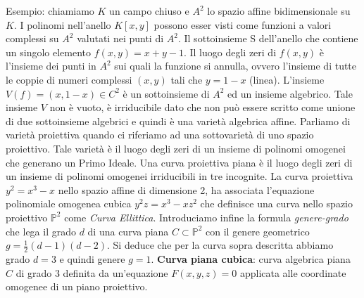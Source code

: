 \documentclass[a4paper,12pt]{tesiinfo}
\newcommand\ddfrac[2]{\frac{\displaystyle #1}{\displaystyle #2}}
\begin{document}
\newline
Esempio: chiamiamo $K$ un campo chiuso e $A^2$ lo spazio affine bidimensionale su $K$. I polinomi nell'anello $K[x, y]$ possono esser visti come funzioni a valori complessi su $A^2$ valutati nei punti di $A^2$. Il sottoinsieme S dell'anello che contiene un singolo elemento $f(x, y) = x + y - 1$. Il luogo degli zeri di $f(x, y)$ \`e l'insieme dei punti in $A^2$ sui quali la funzione si annulla, ovvero l'insieme di tutte le coppie di numeri complessi $(x, y)$ tali che $y = 1 - x$ (linea). L'insieme $V(f) = {(x, 1-x) \in C^2}$ \`e un sottoinsieme di $A^2$ ed un insieme algebrico. Tale insieme $V$ non \`e vuoto, \`e irriducibile dato che non pu\`o essere scritto come unione di due sottoinsieme algebrici e quindi \`e una variet\`a algebrica affine.
%
%
%
\newline\newline
Parliamo di variet\`a proiettiva quando ci riferiamo ad una sottovariet\`a di uno spazio proiettivo. Tale variet\`a \`e il luogo degli zeri di un insieme di polinomi omogenei che generano un Primo Ideale.
\newline
Una curva proiettiva piana \`e il luogo degli zeri di un insieme di polinomi omogenei irriducibili in tre incognite. La curva proiettiva $y^2 = x^3 -x$ nello spazio affine di dimensione 2, ha associata l'equazione polinomiale omogenea cubica $y^2z = x^3 - xz^2$ che definisce una curva nello spazio proiettivo $\mathbb{P}^2$ come \textit{Curva Ellittica}. 
\newline
Introduciamo infine la formula \textit{genere-grado} che lega il grado $d$ di una curva piana $C \subset \mathbb{P}^2$ con il genere geometrico $g = \ddfrac{1}{2} (d-1)(d-2)$.
\newline
Si deduce che per la curva sopra descritta abbiamo grado $d = 3$ e quindi genere $g = 1$.
\newline\newline
%
%
%
\textbf{Curva piana cubica}: curva algebrica piana $C$ di grado 3 definita da un'equazione $F(x, y, z) = 0$ applicata alle coordinate omogenee di un piano proiettivo. 
\end{document}
